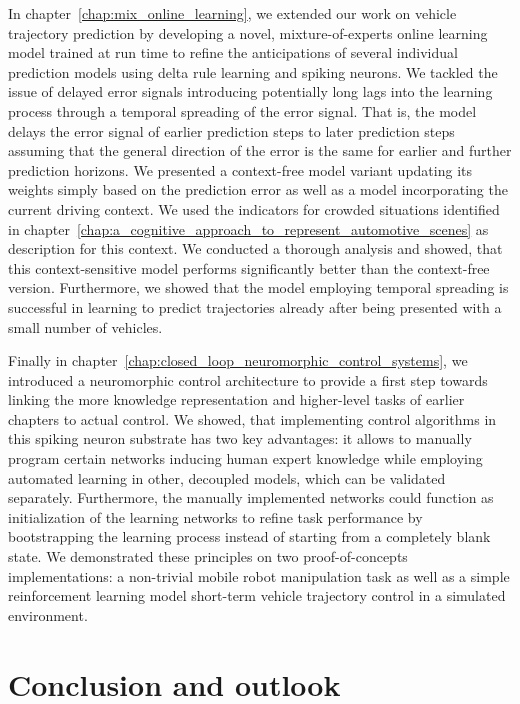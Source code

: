 In chapter~\ref{chap:mix_online_learning}, we extended our work on vehicle trajectory prediction by developing a novel, mixture-of-experts online learning model trained at run time to refine the anticipations of several individual prediction models using delta rule learning and spiking neurons.
We tackled the issue of delayed error signals introducing potentially long lags into the learning process through a temporal spreading of the error signal.
That is, the model delays the error signal of earlier prediction steps to later prediction steps assuming that the general direction of the error is the same for earlier and further prediction horizons.
We presented a context-free model variant updating its weights simply based on the prediction error as well as a model incorporating the current driving context.
We used the indicators for crowded situations identified in chapter~\ref{chap:a_cognitive_approach_to_represent_automotive_scenes} as description for this context.
We conducted a thorough analysis and showed, that this context-sensitive model performs significantly better than the context-free version.
Furthermore, we showed that the model employing temporal spreading is successful in learning to predict trajectories already after being presented with a small number of vehicles.

Finally in chapter~\ref{chap:closed_loop_neuromorphic_control_systems}, we introduced a neuromorphic control architecture to provide a first step towards linking the more knowledge representation and higher-level tasks of earlier chapters to actual control. 
We showed, that implementing control algorithms in this spiking neuron substrate has two key advantages: it allows to manually program certain networks inducing human expert knowledge while employing automated learning in other, decoupled models, which can be validated separately.
Furthermore, the manually implemented networks could function as initialization of the learning networks to refine task performance by bootstrapping the learning process instead of starting from a completely blank state.
We demonstrated these principles on two proof-of-concepts implementations: a non-trivial mobile robot manipulation task as well as a simple reinforcement learning model short-term vehicle trajectory control in a simulated environment.

\section{Conclusion and outlook}%
\label{sec:conclusion_and_outlook}

